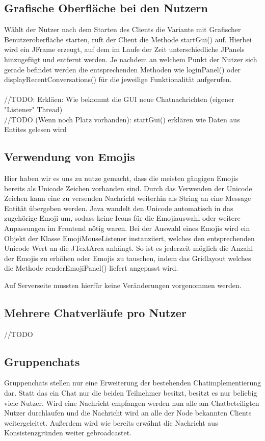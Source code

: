 
\subsection{Grafische Oberfläche bei den Nutzern}
Wählt der Nutzer nach dem Starten des Clients die Variante mit Grafischer Benutzeroberfläche starten, ruft der Client die Methode startGui() auf. Hierbei wird ein JFrame erzeugt, auf dem im Laufe der Zeit unterschiedliche JPanels hinzugefügt und entfernt werden. Je nachdem an welchem Punkt der Nutzer sich gerade befindet werden die entsprechenden Methoden wie loginPanel() oder displayRecentConversations() für die jeweilige Funktionalität aufgerufen. \\ \\
//TODO: Erkläen: Wie bekommt die GUI neue Chatnachrichten (eigener "Listener" Thread) \\
//TODO (Wenn noch Platz vorhanden): startGui() erklären wie Daten aus Entites gelesen wird
\subsection{Verwendung von Emojis}
Hier haben wir es uns zu nutze gemacht, dass die meisten gängigen Emojis bereits als Unicode Zeichen vorhanden sind. Durch das Verwenden der Unicode Zeichen kann eine zu versenden Nachricht weiterhin als String an eine Message Entität übergeben werden. Java wandelt den Unicode automatisch in das zugehörige Emoji um, sodass keine Icons für die Emojiauswahl oder weitere Anpassungen im Frontend nötig waren. Bei der Auswahl eines Emojis wird ein Objekt der Klasse EmojiMouseListener instanziiert, welches den entsprechenden Unicode Wert an die JTextArea anhängt. So ist es jederzeit möglich die Anzahl der Emojis zu erhöhen oder Emojis zu tauschen, indem das Gridlayout welches die Methode renderEmojiPanel() liefert angepasst wird.

Auf Serverseite mussten hierfür keine Veränderungen vorgenommen werden.

\subsection{Mehrere Chatverläufe pro Nutzer}
//TODO

\subsection{Gruppenchats}
Gruppenchats stellen nur eine Erweiterung der bestehenden Chatimplementierung dar. Statt das ein Chat nur die beiden Teilnehmer besitzt, besitzt es nur beliebig viele Nutzer. Wird eine Nachricht empfangen werden nun alle am Chatbeteiligten Nutzer durchlaufen und die Nachricht wird an alle der Node bekannten Clients weitergeleitet. Außerdem wird wie bereits erwähnt die Nachricht aus Konsistenzgründen weiter gebroadcastet.

